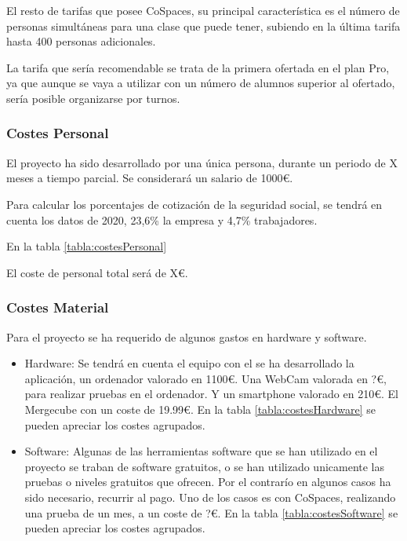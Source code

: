 El resto de tarifas que posee CoSpaces, su principal característica es el número de personas simultáneas para una clase que puede tener, subiendo en la última tarifa hasta 400 personas adicionales.

La tarifa que sería recomendable se trata de la primera ofertada en el plan Pro, ya que aunque se vaya a utilizar con un número de alumnos superior al ofertado, sería posible organizarse por turnos.

\subsubsection{Costes Personal}
El proyecto ha sido desarrollado por una única persona, durante un periodo de X meses a tiempo parcial. Se considerará un salario de 1000\euro.

Para calcular los porcentajes de cotización de la seguridad social, se tendrá en cuenta los datos de 2020, 23,6\% la empresa y 4,7\% trabajadores.

En la tabla \ref{tabla:costesPersonal}

El coste de personal total será de X\euro.


\subsubsection{Costes Material}
Para el proyecto se ha requerido de algunos gastos en hardware y software.

\begin{itemize}
	\item Hardware:
	Se tendrá en cuenta el equipo con el se ha desarrollado la aplicación, un ordenador valorado en 1100\euro. Una WebCam valorada en ?\euro, para realizar pruebas en el ordenador. Y un smartphone valorado en 210\euro. El Mergecube con un coste de 19.99\euro. En la tabla \ref{tabla:costesHardware} se pueden apreciar los costes agrupados.
	\item Software: Algunas de las herramientas software que se han utilizado en el proyecto se traban de software gratuitos, o se han utilizado unicamente las pruebas o niveles gratuitos que ofrecen. Por el contrarío en algunos casos ha sido necesario, recurrir al pago. Uno de los casos es con CoSpaces, realizando una prueba de un mes, a un coste de ?\euro. En la tabla \ref{tabla:costesSoftware} se pueden apreciar los costes agrupados.
\end{itemize}



